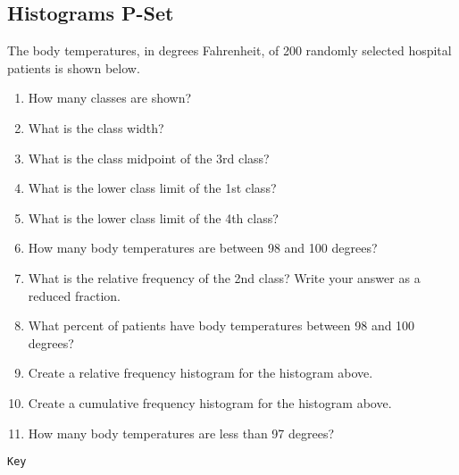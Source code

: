 \documentclass{article}
\begin{document}
\subsection*{Histograms P-Set}

The body temperatures, in degrees Fahrenheit, of 200 randomly selected hospital patients is shown below.

\begin{center}
\end{center}

\begin{enumerate}
    \item How many classes are shown?
    \item What is the class width?
    \item What is the class midpoint of the 3rd class?
    \item What is the lower class limit of the 1st class?
    \item What is the lower class limit of the 4th class?
    \item How many body temperatures are between 98 and 100 degrees?
    \item What is the relative frequency of the 2nd class? Write your answer as a reduced fraction.
    \item What percent of patients have body temperatures between 98 and 100 degrees?
    \item Create a relative frequency histogram for the histogram above.
    \item Create a cumulative frequency histogram for the histogram above.
    \item How many body temperatures are less than 97 degrees?
\end{enumerate}

\newpage 

\texttt{Key}
\end{document}

